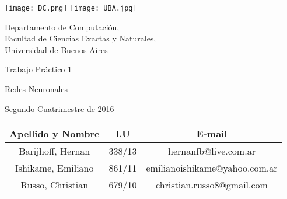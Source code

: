\documentclass[a4paper, 10pt, twoside]{article}
\newcommand{\titulo}{Trabajo Práctico 1}
\newcommand{\materia}{Redes Neuronales}
\newcommand{\cuatrimestre}{Segundo Cuatrimestre de 2016}
\begin{document}


\thispagestyle{caratula}

\begin{center}

\texttt{[image: DC.png]} 
\hfill
\texttt{[image: UBA.jpg]} 

\vspace{2cm}

Departamento de Computación,\\
Facultad de Ciencias Exactas y Naturales,\\
Universidad de Buenos Aires

\vspace{4cm}

\begin{Huge}
\titulo
\end{Huge}

\vspace{0.5cm}

\begin{Large}
\materia
\end{Large}

\vspace{1cm}

\cuatrimestre

\vspace{4cm}

\begin{tabular}{|c|c|c|}
\hline
Apellido y Nombre & LU & E-mail\\
\hline
Barijhoff, Hernan           & 338/13 & hernanfb@live.com.ar \\
Ishikame, Emiliano               & 861/11 & emilianoishikame@yahoo.com.ar \\
Russo, Christian              & 679/10 & christian.russo8@gmail.com\\
\hline
\end{tabular}

\end{center}

\newpage

\tableofcontents

\newpage











\newpage
\end{document}
